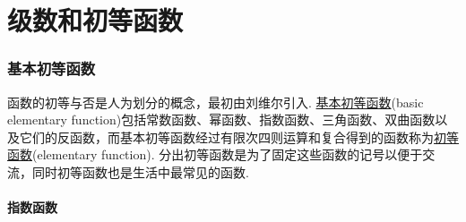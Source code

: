 \documentclass[main.tex]{subfiles}
\begin{document}
\part{级数和初等函数}
\setcounter{section}{0}

\section{基本初等函数}

函数的初等与否是人为划分的概念，最初由刘维尔引入. \uline{基本初等函数}(basic elementary function)包括常数函数、幂函数、指数函数、三角函数、双曲函数以及它们的反函数，而基本初等函数经过有限次四则运算和复合得到的函数称为\uline{初等函数}(elementary function). 分出初等函数是为了固定这些函数的记号以便于交流，同时初等函数也是生活中最常见的函数. 

\subsection{指数函数}
\end{document}
